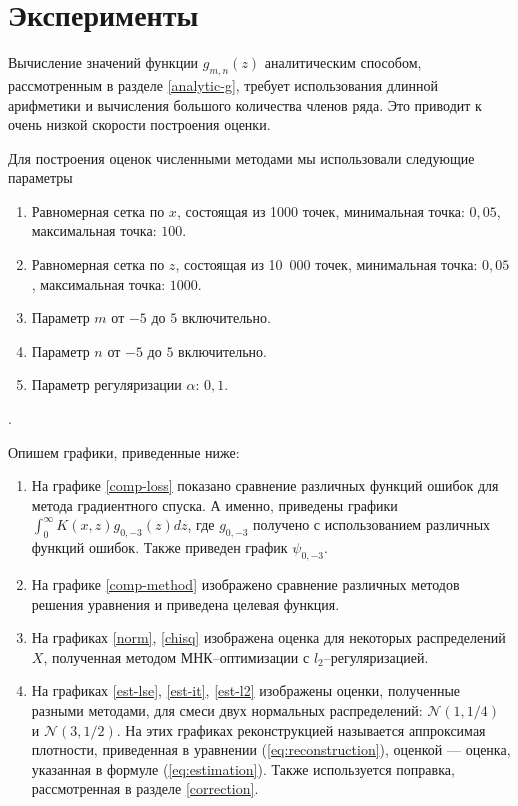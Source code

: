 \documentclass[../paper.tex]{subfiles}
\begin{document}
\section{Эксперименты}
%
Вычисление значений функции $g_{m,n}(z)$ аналитическим способом, рассмотренным в разделе \ref{analytic-g}, требует использования длинной арифметики
и вычисления большого количества членов ряда. Это приводит к очень низкой скорости построения оценки. 

Для построения оценок численными методами мы использовали следующие параметры
\begin{enumerate}
	\item Равномерная сетка по $x$, состоящая из 1000 точек, минимальная точка: $0{,}05$, максимальная точка: $100$.
	\item Равномерная сетка по $z$, состоящая из 10~000 точек, минимальная точка: $0{,}05$, максимальная точка: $1000$.
	\item Параметр $m$ от $-5$ до $5$ включительно.
	\item Параметр $n$ от $-5$ до $5$ включительно.
	\item Параметр регуляризации $\alpha$: $0{,}1$.
\end{enumerate}.

Опишем графики, приведенные ниже:
\begin{enumerate}
	\item На графике \ref{comp-loss} показано сравнение различных функций ошибок для метода градиентного спуска.
		А именно, приведены графики $\int_0^\infty K(x,z)g_{0,-3}(z)dz$, где $g_{0,-3}$ получено с использованием различных функций ошибок.
		Также приведен график $\psi_{0,-3}$.
	\item На графике \ref{comp-method} изображено сравнение различных методов решения уравнения и приведена целевая функция.
	\item На графиках \ref{norm}, \ref{chisq} изображена оценка для некоторых распределений $X$, полученная методом МНК--оптимизации с $l_2$--регуляризацией.
	\item На графиках \ref{est-lse}, \ref{est-it}, \ref{est-l2} изображены оценки, 
		полученные разными методами, для смеси двух нормальных распределений: $\mathcal{N}(1, 1/4)$ и $\mathcal{N}(3, 1/2)$.
		На этих графиках реконструкцией называется аппроксимая плотности, приведенная в уравнении (\ref{eq:reconstruction}), оценкой --- оценка, указанная в формуле (\ref{eq:estimation}). Также используется поправка, рассмотренная в разделе \ref{correction}.
\end{enumerate}
\end{document}
